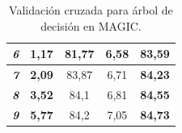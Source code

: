 \begin{table}[ht]
\begin{tabular}{@{}r|c|c|c|c|@{}}
\multicolumn{1}{|r|}{\textit{\textbf{6}}}           & \textbf{1,17}                                                           & 81,77                                                                       & 6,58                                                                    & \textbf{83,59}                                                              \\ \midrule
\multicolumn{1}{|r|}{\textit{\textbf{7}}}           & \textbf{2,09}                                                           & 83,87                                                                       & 6,71                                                                    & \textbf{84,23}                                                              \\ \midrule
\multicolumn{1}{|r|}{\textit{\textbf{8}}}           & \textbf{3,52}                                                           & 84,1                                                                        & 6,81                                                                    & \textbf{84,55}                                                              \\ \midrule
\multicolumn{1}{|r|}{\textit{\textbf{9}}}           & \textbf{5,77}                                                           & 84,2                                                                        & 7,05                                                                    & \textbf{84,73}                                                              \\ \bottomrule
\end{tabular}
\caption{Validación cruzada para árbol de decisión en MAGIC.}
\label{tab:magictree}
\end{table}
\newpage

